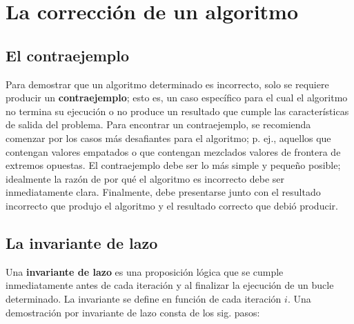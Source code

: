 \chapter{La corrección de un algoritmo}

\section{El contraejemplo}




Para demostrar que un algoritmo determinado es incorrecto, solo se requiere producir un \textbf{contraejemplo}; esto es, un caso específico para el cual el algoritmo no termina su ejecución o no produce un resultado que cumple las características de salida del problema.
Para encontrar un contraejemplo, se recomienda comenzar por los casos más desafiantes para el algoritmo; p. ej., aquellos que contengan valores empatados o que contengan mezclados valores de frontera de extremos opuestas.
El contraejemplo debe ser lo más simple y pequeño posible; idealmente la razón de por qué el algoritmo es incorrecto debe ser inmediatamente clara. 
Finalmente, debe presentarse junto con el resultado incorrecto que produjo el algoritmo y el resultado correcto que debió producir.

\section{La invariante de lazo}

Una \textbf{invariante de lazo} es una proposición lógica que se cumple inmediatamente antes de cada iteración y al finalizar la ejecución de un bucle determinado.
La invariante se define en función de cada iteración \(i\).
Una demostración por invariante de lazo consta de los sig. pasos:



